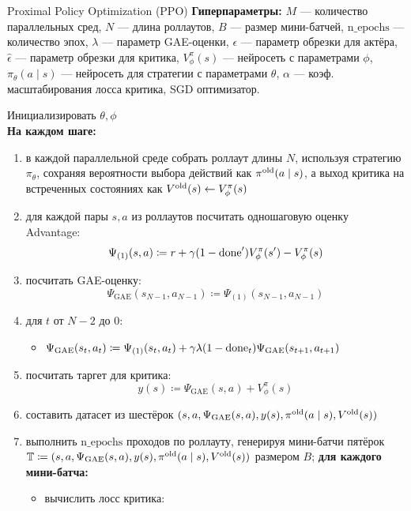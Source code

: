 \begin{algorithm}[label = PPOalgorithm]{Proximal Policy Optimization (PPO)}
\textbf{Гиперпараметры:} $M$ --- количество параллельных сред, $N$ --- длина роллаутов, $B$ --- размер мини-батчей, $\mathrm{n\_epochs}$ --- количество эпох, $\lambda$ --- параметр GAE-оценки, $\epsilon$ --- параметр обрезки для актёра, $\hat{\epsilon}$ --- параметр обрезки для критика, $V^\pi_\phi(s)$ --- нейросеть с параметрами $\phi$, $\pi_{\theta}(a \mid s)$ --- нейросеть для стратегии с параметрами $\theta$, $\alpha$ --- коэф. масштабирования лосса критика, SGD оптимизатор.

\vspace{0.3cm}
Инициализировать $\theta, \phi$ \\
\textbf{На каждом шаге:}
\begin{enumerate}
    \item в каждой параллельной среде собрать роллаут длины $N$, используя стратегию $\pi_{\theta}$, сохраняя вероятности выбора действий как $\pi^{\mathrm{old}}(a \mid s)$, а выход критика на встреченных состояниях как $V^{\mathrm{old}}(s) \leftarrow V^{\pi}_{\phi}(s)$
    \item для каждой пары $s, a$ из роллаутов посчитать одношаговую оценку Advantage:
    $$\Psi_{(1)}(s, a) \coloneqq r + \gamma (1 - \mathrm{done}') V^\pi_{\phi}(s') - V^\pi_{\phi}(s)$$
    \item посчитать GAE-оценку:
    $$\Psi_{\mathrm{GAE}}(s_{N-1}, a_{N-1}) \coloneqq \Psi_{(1)}(s_{N-1}, a_{N-1})$$
    \item для $t$ от $N - 2$ до 0:
    \begin{itemize}
    \item $\Psi_{\mathrm{GAE}}(s_t, a_t) \coloneqq \Psi_{(1)}(s_t, a_t) + \gamma \lambda (1 - \mathrm{done}_t) \Psi_{\mathrm{GAE}}(s_{t+1}, a_{t+1})$
    \end{itemize}
    \item посчитать таргет для критика:
    $$y(s) \coloneqq \Psi_{\mathrm{GAE}}(s, a) + V^\pi_{\phi}(s)$$
    \item составить датасет из шестёрок $(s, a, \Psi_{\mathrm{GAE}}(s, a), y(s), \pi^{\mathrm{old}}(a \mid s), V^{\mathrm{old}}(s))$
    \item выполнить $\mathrm{n\_epochs}$ проходов по роллауту, генерируя мини-батчи пятёрок $\mathbb{T} \coloneqq (s, a, \Psi_{\mathrm{GAE}}(s, a), y(s), \pi^{\mathrm{old}}(a \mid s), V^{\mathrm{old}}(s))$ размером $B$; \textbf{для каждого мини-батча:}
    \begin{itemize}
    \item вычислить лосс критика:

\end{itemize}
\end{enumerate}
\end{algorithm}
